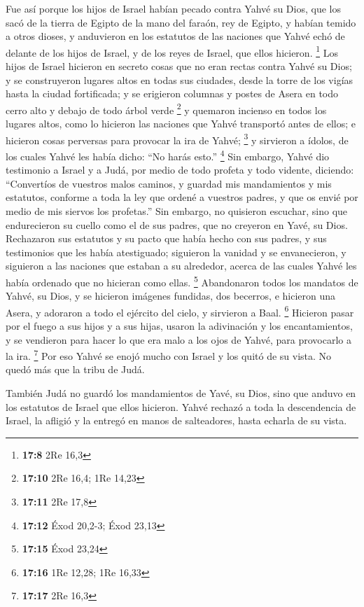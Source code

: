  Fue así porque los hijos de Israel habían pecado contra
Yahvé su Dios, que los sacó de la tierra de Egipto de la mano del
faraón, rey de Egipto, y habían temido a otros dioses,  y
anduvieron en los estatutos de las naciones que Yahvé echó de delante de
los hijos de Israel, y de los reyes de Israel, que ellos hicieron.
\footnote{\textbf{17:8} 2Re 16,3}  Los hijos de Israel
hicieron en secreto cosas que no eran rectas contra Yahvé su Dios; y se
construyeron lugares altos en todas sus ciudades, desde la torre de los
vigías hasta la ciudad fortificada;  y se erigieron
columnas y postes de Asera en todo cerro alto y debajo de todo árbol
verde \footnote{\textbf{17:10} 2Re 16,4; 1Re 14,23}  y
quemaron incienso en todos los lugares altos, como lo hicieron las
naciones que Yahvé transportó antes de ellos; e hicieron cosas perversas
para provocar la ira de Yahvé; \footnote{\textbf{17:11} 2Re 17,8}
 y sirvieron a ídolos, de los cuales Yahvé les había
dicho: ``No harás esto.'' \footnote{\textbf{17:12} Éxod 20,2-3; Éxod
  23,13}  Sin embargo, Yahvé dio testimonio a Israel y a
Judá, por medio de todo profeta y todo vidente, diciendo: ``Convertíos
de vuestros malos caminos, y guardad mis mandamientos y mis estatutos,
conforme a toda la ley que ordené a vuestros padres, y que os envié por
medio de mis siervos los profetas.''  Sin embargo, no
quisieron escuchar, sino que endurecieron su cuello como el de sus
padres, que no creyeron en Yavé, su Dios.  Rechazaron sus
estatutos y su pacto que había hecho con sus padres, y sus testimonios
que les había atestiguado; siguieron la vanidad y se envanecieron, y
siguieron a las naciones que estaban a su alrededor, acerca de las
cuales Yahvé les había ordenado que no hicieran como ellas. \footnote{\textbf{17:15}
  Éxod 23,24}  Abandonaron todos los mandatos de Yahvé,
su Dios, y se hicieron imágenes fundidas, dos becerros, e hicieron una
Asera, y adoraron a todo el ejército del cielo, y sirvieron a Baal.
\footnote{\textbf{17:16} 1Re 12,28; 1Re 16,33}  Hicieron
pasar por el fuego a sus hijos y a sus hijas, usaron la adivinación y
los encantamientos, y se vendieron para hacer lo que era malo a los ojos
de Yahvé, para provocarlo a la ira. \footnote{\textbf{17:17} 2Re 16,3}
 Por eso Yahvé se enojó mucho con Israel y los quitó de
su vista. No quedó más que la tribu de Judá.

 También Judá no guardó los mandamientos de Yavé, su
Dios, sino que anduvo en los estatutos de Israel que ellos hicieron.
 Yahvé rechazó a toda la descendencia de Israel, la
afligió y la entregó en manos de salteadores, hasta echarla de su vista.

